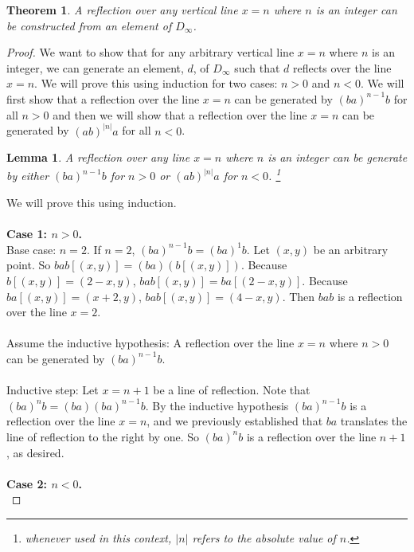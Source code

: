 \documentclass{article}
\newtheorem{theorem}{Theorem}
\newtheorem{lemma}{Lemma}
\theoremstyle{definition}
\begin{document}
\begin{theorem}
    A reflection over any vertical line $x = n$ where $n$ is an integer can be constructed from an element of $D_{\infty}$.
\end{theorem}


\begin{proof}
        We want to show that for any arbitrary vertical line $x = n$ where $n$ is an integer, we can generate an element, $d$, of $D_{\infty}$ such that $d$ reflects over the line $x = n$. We will prove this using induction for two cases: $n > 0$ and $n < 0$. We will first show that a reflection over the line $x = n$ can be generated by $(ba)^{n-1}b$ for all $n > 0$ and then we will show that a reflection over the line $x = n$ can be generated by $(ab)^{|n|}a$ for all $n < 0$.
\begin{lemma}
A reflection over any line $x = n$ where $n$ is an integer can be generate by either $(ba)^{n-1}b$ for $n > 0$ or $(ab)^{|n|}a$  for $n < 0$. \footnote{whenever used in this context, $|n|$ refers to the absolute value of $n$.} \\
\end{lemma}
\noindent We will prove this using induction.\\
\\
\textbf{Case 1: $n> 0$.}\\

\noindent Base case: $n = 2$. If $n = 2$, $(ba)^{n-1}b = (ba)^{1}b$. Let $(x,y)$ be an arbitrary point. So $bab[(x,y)] = (ba)(b[(x,y)])$. Because $b[(x,y)] = (2-x,y)$, $bab[(x,y)] = ba[(2-x,y)]$. Because $ba[(x,y)] = (x+2,y)$, $bab[(x,y)] = (4 - x, y)$. Then $bab$ is a reflection over the line $x = 2$. \\
    \\
    Assume the inductive hypothesis: A reflection over the line $x = n$ where $n > 0$ can be generated by $(ba)^{n-1}b$.\\
\\
    Inductive step: Let $x = n+1$ be a line of reflection. Note that $(ba)^{n}b = (ba)(ba)^{n-1}b$. By the inductive hypothesis $(ba)^{n-1}b$ is a reflection over the line $x = n$, and we previously established that $ba$ translates the line of reflection to the right by one. So $(ba)^{n}b$ is a reflection over the line $n + 1$, as desired.\\
\\
\textbf{Case 2: $n< 0$.} \\


\end{proof}
\end{document}
